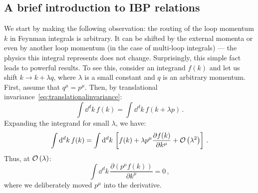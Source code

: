 \documentclass[main.tex]{subfiles}
\begin{document}
\subsection{A brief introduction to IBP relations} \label{sec:ibpintro}
We start by making the following observation: the routing of the loop momentum $k$ in Feynman integrals is arbitrary. It can be shifted by the external momenta or even by another loop momentum (in the case of multi-loop integrals) --- the physics this integral represents does not change. Surprisingly, this simple fact leads to powerful results. To see this, consider an integrand $f(k)$ and let us shift $k \rightarrow k + \lambda q$, where $\lambda$ is a small constant and $q$ is an arbitrary momentum. First, assume that $q^\mu = p^\mu$. Then, by translational invariance~\ref{eq:translationalinvariance}:
\begin{equation}
    \int \dd^d k\, f(k) = \int \dd^d k\, f(k+\lambda p) \,.
\end{equation}
Expanding the integrand for small $\lambda$, we have:
\begin{equation}
    \int \mathrm{d}^d k\, f(k) = \int \mathrm{d}^d k\, \left[ f(k) + \lambda p^\mu \frac{\partial f(k)}{\partial k^\mu} + \mathcal{O}\left(\lambda^2\right) \right]\,.
\end{equation}
Thus, at $\mathcal{O}\left(\lambda\right)$:
\begin{equation}
    \int \dd^d k\, \frac{\partial (p^\mu f(k))}{\partial k^\mu} = 0\,,
\end{equation}
where we deliberately moved $p^\mu$ into the derivative.
\end{document}
